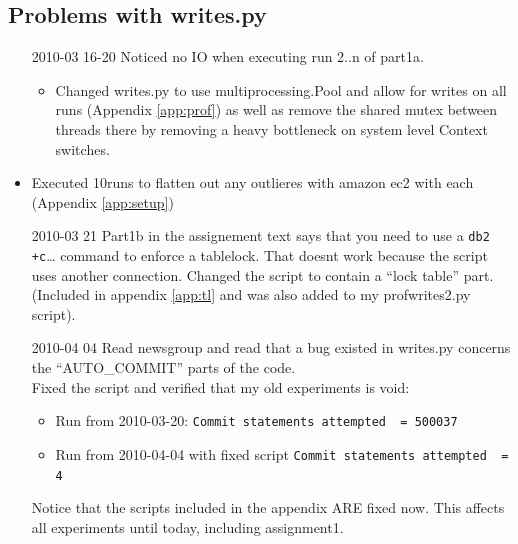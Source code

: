 \subsection{Problems with writes.py}\label{log:probwrite}
\begin{itemize}
  \item[2010-03 16-20] Noticed no IO when executing run 2..n of part1a.
    \begin{itemize}
      \item Changed writes.py to use multiprocessing.Pool and allow for writes on
    all runs (Appendix \ref{app:prof}) as well as remove the shared mutex
    between threads there by removing a heavy bottleneck on system level Context
    switches.
   \end{itemize}
  \item Executed 10runs to flatten out any outlieres with amazon ec2 with each
    (Appendix \ref{app:setup})
  \item[2010-03 21] Part1b in the assignement text says that you need to use a \verb|db2 +c|\ldots
    command to enforce a tablelock. That doesnt work because the script uses
    another connection. Changed the script to contain a ``lock table'' part.
    (Included in appendix \ref{app:tl} and was also added to my profwrites2.py
    script).
  \item[2010-04 04] Read newsgroup and read that a bug existed in writes.py
    concerns the ``AUTO\_COMMIT'' parts of the code.\\
    Fixed the script and verified that my old experiments is void:
    \begin{itemize}
      \item Run from 2010-03-20: \verb|Commit statements attempted  = 500037|
      \item Run from 2010-04-04 with fixed script \verb|Commit statements attempted  = 4|
    \end{itemize}
    Notice that the scripts included in the appendix ARE fixed now. 
    This affects all experiments until today, including assignment1.
\end{itemize}

